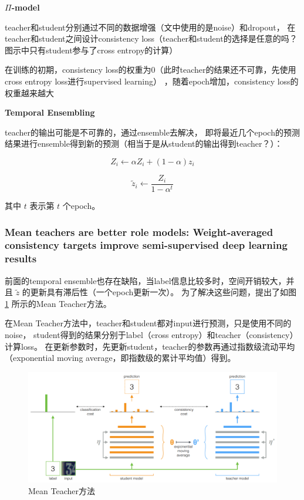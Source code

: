 \documentclass[UTF8]{ctexart}
\begin{document}
                \textbf{$\Pi$-model}

                teacher和student分别通过不同的数据增强（文中使用的是noise）和dropout，
                在teacher和student之间设计consistency loss（teacher和student的选择是任意的吗？图示中只有student参与了cross entropy的计算）

                在训练的初期，consistency loss的权重为0（此时teacher的结果还不可靠，先使用cross entropy loss进行supervised learning）
                ，随着epoch增加，consistency loss的权重越来越大

                \textbf{Temporal Ensembling}

                teacher的输出可能是不可靠的，通过ensemble去解决，
                即将最近几个epoch的预测结果进行ensemble得到新的预测（相当于是从student的输出得到teacher？）：

                $$
                    Z_i \leftarrow \alpha Z_i + (1-\alpha)z_i
                $$

                $$
                    \tilde{z}_i \leftarrow \frac{Z_i}{1-{\alpha}^t}
                $$

                其中 $t$ 表示第 $t$ 个epoch。
            \subsubsection{Mean teachers are better role models: Weight-averaged consistency targets improve semi-supervised deep learning results}
                前面的temporal ensemble也存在缺陷，当label信息比较多时，空间开销较大，并且 $\tilde{z}$ 的更新具有滞后性（一个epoch更新一次）。
                为了解决这些问题，提出了如图 \ref{fig:MT} 所示的Mean Teacher方法。

                在Mean Teacher方法中，teacher和student都对input进行预测，只是使用不同的noise，
                student得到的结果分别于label（cross entropy）和teacher（consistency）计算loss。
                在更新参数时，先更新student，teacher的参数再通过指数级流动平均
                （exponential moving average，即指数级的累计平均值）得到。
                \begin{figure}[ht]
                    \centering
                    \includegraphics[scale=0.34]{Week05_Mean_Teacher.png}
                    \caption{Mean Teacher方法}
                    \label{fig:MT}
                \end{figure}
\end{document}
